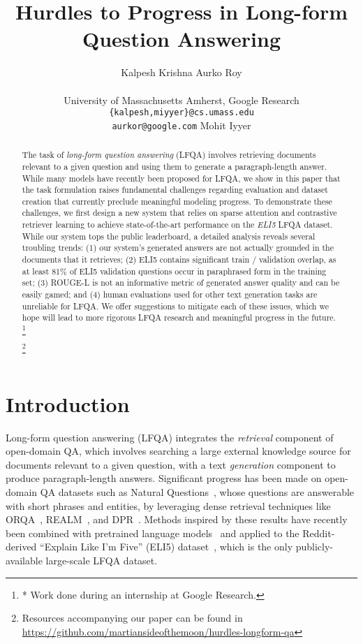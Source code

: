 \documentclass[11pt]{article}
\title{Hurdles to Progress in Long-form Question Answering}
\author{Kalpesh Krishna \And Aurko Roy \\\\ University of Massachusetts Amherst, Google Research \\ \texttt{\{kalpesh,miyyer\}@cs.umass.edu}\\ \texttt{aurkor@google.com} \And Mohit Iyyer}
\newcommand\blfootnote[1]{\begingroup
  \renewcommand\thefootnote{}\footnote{#1}\addtocounter{footnote}{-1}\endgroup
}
\begin{document}
\maketitle
\begin{abstract}

The task of \emph{long-form question answering} (LFQA) involves retrieving documents relevant to a given question and using them to generate a paragraph-length answer. While many models have recently been proposed for LFQA, we show in this paper that the task formulation raises fundamental challenges regarding evaluation and dataset creation that currently preclude meaningful modeling progress. To demonstrate these challenges, we first design a new system that relies on sparse attention and
contrastive retriever learning to achieve state-of-the-art performance on the \emph{ELI5} LFQA dataset. While our system tops the public leaderboard, a detailed analysis reveals several troubling trends: (1) our system's generated answers are not actually grounded in the documents that it retrieves; (2) ELI5 contains significant train / validation overlap, as at least 81\% of ELI5 validation questions occur in paraphrased form in the training set; (3) ROUGE-L is not an informative metric of generated answer quality and can be easily gamed; and (4) human evaluations used for other text generation tasks are unreliable for LFQA. We offer suggestions to mitigate each of these issues, which we hope will lead to more rigorous LFQA research and meaningful progress in the future.\blfootnote{* Work done during an internship at Google Research.}\footnote{Resources accompanying our paper can be found in \url{https://github.com/martiansideofthemoon/hurdles-longform-qa}}

\end{abstract} \section{Introduction}

Long-form question answering (LFQA) integrates the \emph{retrieval} component of open-domain QA, which involves searching a large external knowledge source for documents relevant to a given question, with a text \emph{generation} component to produce paragraph-length answers. Significant progress has been made on open-domain QA datasets such as Natural Questions~\citep{kwiatkowski2019natural}, whose questions are answerable with short phrases and entities, by leveraging dense retrieval techniques like ORQA~\citep{lee-etal-2019-latent}, REALM~\citep{guu2020realm}, and DPR~\citep{karpukhin2020dense,lewis2020retrieval,izacard2020leveraging}. Methods inspired by these results have recently been combined with pretrained language models~\citep{lewis2019bart,petroni2020kilt} and applied to the Reddit-derived ``Explain Like I'm Five'' (ELI5) dataset~\citep{fan-etal-2019-eli5}, which is the only publicly-available large-scale LFQA dataset.
\end{document}
